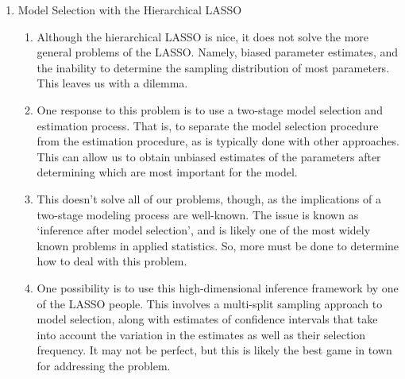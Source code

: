 \begin{enumerate}
\begin{enumerate}
        \item Regularization is the last and most commonly used approach to model selection in network modeling. The LASSO is the overwhelming favorite within this community, due to its particularly elegant properties. However, it also has some serious drawbacks. One drawback, that also follows with traditional stepwise procedures, is that interaction terms are not taken to have a special kind of status in a model. That is, the model selection procedure can lead to models with higher-order terms and not the constituent lower-order terms. Good reasons to not do this.
        \item Luckily, there is a form of LASSO called the hierarchical LASSO designed specifically to address this problem. We can use this framework for model selection with moderated networks, although it does not necessarily solve all of our problems.
    \end{enumerate}
    \item Model Selection with the Hierarchical LASSO
    \begin{enumerate}
        \item Although the hierarchical LASSO is nice, it does not solve the more general problems of the LASSO. Namely, biased parameter estimates, and the inability to determine the sampling distribution of most parameters. This leaves us with a dilemma.
        \item One response to this problem is to use a two-stage model selection and estimation process. That is, to separate the model selection procedure from the estimation procedure, as is typically done with other approaches. This can allow us to obtain unbiased estimates of the parameters after determining which are most important for the model. 
        \item This doesn't solve all of our problems, though, as the implications of a two-stage modeling process are well-known. The issue is known as `inference after model selection', and is likely one of the most widely known problems in applied statistics. So, more must be done to determine how to deal with this problem.
        \item One possibility is to use this high-dimensional inference framework by one of the LASSO people. This involves a multi-split sampling approach to model selection, along with estimates of confidence intervals that take into account the variation in the estimates as well as their selection frequency. It may not be perfect, but this is likely the best game in town for addressing the problem. 

\end{enumerate}
\end{enumerate}
